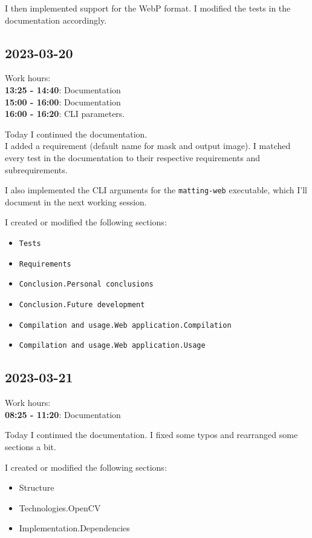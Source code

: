\documentclass{article}
\begin{document}
I then implemented support for the WebP format.
I modified the tests in the documentation accordingly.

\pagebreak

\subsection{2023-03-20}

Work hours:\\
\textbf{13:25 - 14:40}: Documentation \\
\textbf{15:00 - 16:00}: Documentation \\
\textbf{16:00 - 16:20}: CLI parameters.

Today I continued the documentation. \\
I added a requirement (default name for mask and output image).
I matched every test in the documentation to their respective
requirements and subrequirements.

I also implemented the CLI arguments for the \texttt{matting-web}
executable, which I'll document in the next working session.

I created or modified the following sections:
\begin{itemize}
    \item \texttt{Tests}
    \item \texttt{Requirements}
    \item \texttt{Conclusion.Personal conclusions}
    \item \texttt{Conclusion.Future development}
    \item \texttt{Compilation and usage.Web application.Compilation}
    \item \texttt{Compilation and usage.Web application.Usage}
\end{itemize}

\pagebreak

\subsection{2023-03-21}

Work hours:\\
\textbf{08:25 - 11:20}: Documentation

Today I continued the documentation.
I fixed some typos and rearranged some sections a bit.

I created or modified the following sections:
\begin{itemize}
    \item Structure
    \item Technologies.OpenCV
    \item Implementation.Dependencies
\end{itemize}
\end{document}
